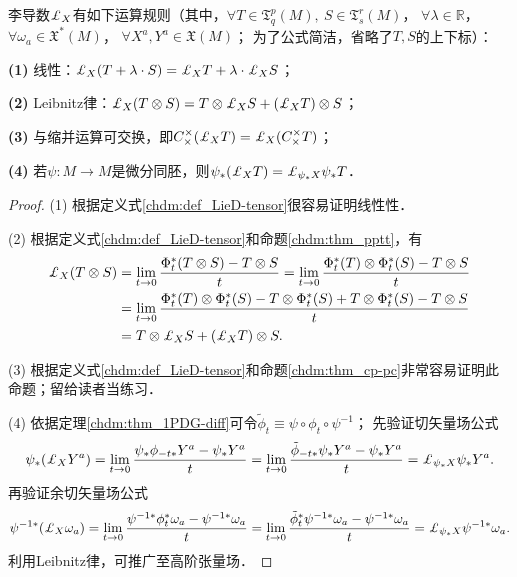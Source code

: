 \begin{theorem}\label{chdm:thm_LieD-property}
    李导数$\Lie_{X}$有如下运算规则（其中，$\forall T\in \mathfrak{T}^p_q(M),\ S\in \mathfrak{T}^r_s(M)$，
    $\forall \lambda \in \mathbb{R}$， $\forall \omega_a\in \mathfrak{X}^*(M)$，
    $\forall X^a,Y^a\in \mathfrak{X}(M)$；
    为了公式简洁，省略了$T,S$的上下标）：
    
    {\bfseries (1)} 线性：$\Lie_{X}(T + \lambda \cdot S) = \Lie_{X}T + \lambda\cdot \Lie_{X}S$；
    
    {\bfseries (2)} Leibnitz律：$\Lie_{X} (T \otimes S) = T \otimes \Lie_{X} S + (\Lie_{X} T )\otimes S$；
    
    {\bfseries (3)} 与缩并运算可交换，即$C^\times_\times (\Lie_{X} T) =  \Lie_{X} (C^\times_\times T) $；
    
    
    
    {\bfseries (4)} 若$\psi:M\to M$是微分同胚，则$\psi_*(\Lie_{X} T) = \Lie_{\psi_*X} \psi_* T$．
\end{theorem}
\begin{proof}
    (1) 根据定义式\eqref{chdm:def_LieD-tensor}很容易证明线性性．
    
    (2) 根据定义式\eqref{chdm:def_LieD-tensor}和命题\ref{chdm:thm_pptt}，有
    \begin{align*}
        \Lie_{X} (T \otimes S) & = \lim_{t\to 0} \frac{\Phi^{*}_{t} (T\otimes S) -T\otimes S }{t} 
          = \lim_{t\to 0} \frac{\Phi^{*}_{t} (T)\otimes \Phi^{*}_{t}(S) -T\otimes S }{t}\\
        & = \lim_{t\to 0} \frac{\Phi^{*}_{t} (T)\otimes \Phi^{*}_{t}(S) 
             -T\otimes \Phi^{*}_{t}(S) +T\otimes \Phi^{*}_{t}(S) -T\otimes S }{t} \\
        & = T \otimes \Lie_{X} S + (\Lie_{X} T )\otimes S .
    \end{align*}

    (3) 根据定义式\eqref{chdm:def_LieD-tensor}和命题\ref{chdm:thm_cp-pc}非常容易证明此命题；留给读者当练习．


    (4) 依据定理\ref{chdm:thm_1PDG-diff}可令$\tilde{\phi}_t \equiv \psi \circ \phi_t \circ \psi^{-1}$；
    先验证切矢量场公式
    \begin{equation*}
        \psi_*(\Lie_{X} Y^a)  = \lim_{t\to 0} \frac{\psi_*{\phi}_{-t*} Y^a - \psi_*Y^a }{t} 
       = \lim_{t\to 0} \frac{\tilde{\phi}_{-t*} \psi_*Y^a -\psi_*Y^a }{t} 
       =\Lie_{\psi_*X} \psi_*Y^a .
    \end{equation*}
    再验证余切矢量场公式
    \begin{align*}
        \psi^{-1*}(\Lie_{X} \omega_a)  = \lim_{t\to 0} \frac{\psi^{-1*} {\phi}_{t}^{*} 
            \omega_a - \psi^{-1*}\omega_a }{t} 
        = \lim_{t\to 0} \frac{ \tilde{\phi}_{t}^{*} \psi^{-1*}\omega_a - \psi^{-1*}\omega_a }{t} 
        =\Lie_{\psi_*X} \psi^{-1*}\omega_a  .
    \end{align*}
    利用Leibnitz律，可推广至高阶张量场．
\end{proof}

